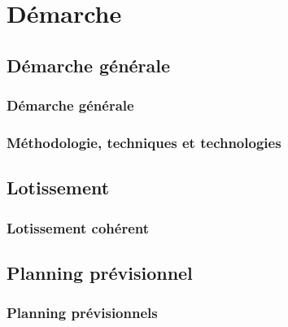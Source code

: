 \section{Démarche}

\subsection{Démarche générale}

\subsubsection{Démarche générale}

\subsubsection{Méthodologie, techniques et technologies}

\subsection{Lotissement}

\subsubsection{Lotissement cohérent}

\subsection{Planning prévisionnel}

\subsubsection{Planning prévisionnels}